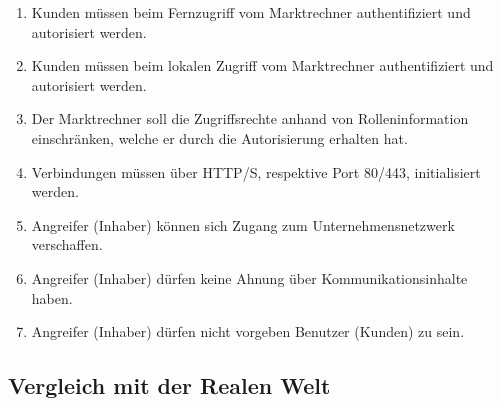 \documentclass[11pt,a4paper]{report}
\begin{document}
\begin{enumerate}[leftmargin=*]
\item Kunden müssen beim Fernzugriff vom Marktrechner authentifiziert und autorisiert werden.
\item Kunden müssen beim lokalen Zugriff vom Marktrechner authentifiziert und autorisiert werden.
\item Der Marktrechner soll die Zugriffsrechte anhand von Rolleninformation einschränken, welche er durch die Autorisierung erhalten hat.
\item Verbindungen müssen über HTTP/S, respektive Port 80/443, initialisiert werden.
\item Angreifer (Inhaber) können sich Zugang zum Unternehmensnetzwerk verschaffen.
\item Angreifer (Inhaber) dürfen keine Ahnung über Kommunikationsinhalte haben.
\item Angreifer (Inhaber) dürfen nicht vorgeben Benutzer (Kunden) zu sein.
\end{enumerate}

\subsection{Vergleich mit der Realen Welt}
\end{document}

